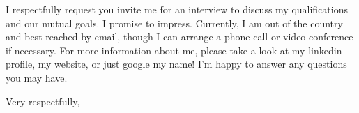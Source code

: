 \documentclass[11pt]{letter} %
\begin{document}
\begin{letter}
\noindent I respectfully request you invite me for an interview to discuss my qualifications and our mutual goals. I promise to impress. Currently, I am out of the country and best reached by email, though I can arrange a phone call or video conference if necessary. For more information about me, please take a look at my linkedin profile, my website, or just google my name! I'm happy to answer any questions you may have.


 

 
\closing{Very respectfully,}
 
 
\encl{}  				%

\end{letter}
 
\end{document}
